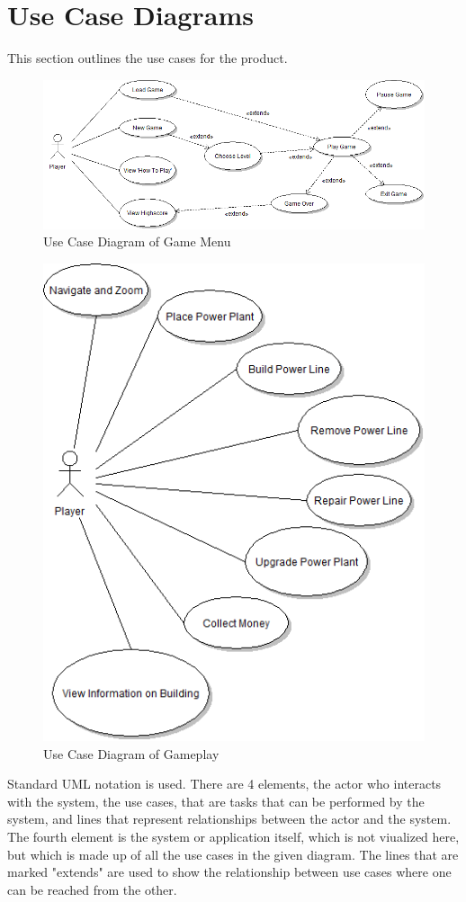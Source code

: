 \section{Use Case Diagrams}

This section outlines the use cases for the product.

\begin{figure}[H]
  	\centering
	\includegraphics[scale=0.45]{pictures/UCD_Menu.png}
	\caption{Use Case Diagram of Game Menu}
\end{figure}

\begin{figure}[H]
  	\centering
	\includegraphics[scale=0.5]{pictures/UCD_PlayGame.png}
	\caption{Use Case Diagram of Gameplay}
\end{figure}

Standard UML notation is used. There are 4 elements, the actor who interacts with the system, the use cases, that are tasks that can be performed by the system, and lines that represent relationships between the actor and the system. The fourth element is the system or application itself, which is not viualized here, but which is made up of all the use cases in the given diagram. The lines that are marked "extends" are used to show the relationship between use cases where one can be reached from the other. \cite{usecaseUML}